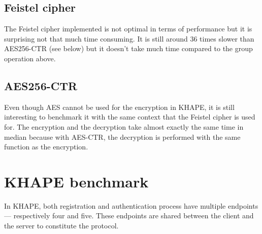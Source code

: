﻿\documentclass[../report.tex]{subfiles}
\begin{document}
\pgfplotsset{width=\textwidth-0.1cm}
\pgfplotsset{height=6cm}


\subsection*{Feistel cipher}
The Feistel cipher implemented is not optimal in terms of performance but it is surprising not that much time consuming.
It is still around 36 times slower than AES256-CTR (see below) but it doesn't take much time compared to the group operation above.




\subsection*{AES256-CTR}
Even though AES cannot be used for the encryption in KHAPE, it is still interesting to benchmark it with the same context that the Feistel cipher is used for.
The encryption and the decryption take almost exactly the same time in median because with AES-CTR, the decryption is performed with the same function as the encryption.




\section{KHAPE benchmark} %
In KHAPE, both registration and authentication process have multiple endpoints --- respectively four and five. These endpoints are shared between the client and the server to constitute the protocol.
\end{document}
